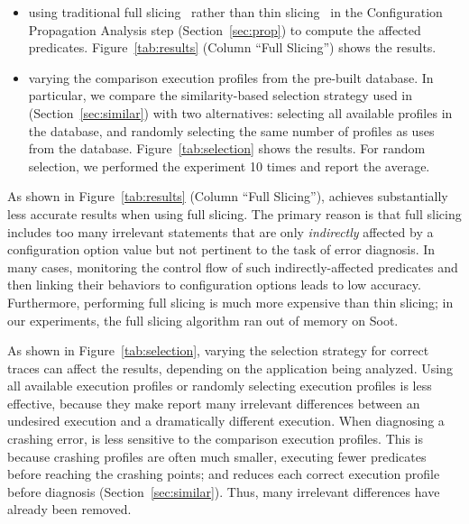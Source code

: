 \begin{itemize}
\item using traditional full slicing~\cite{Horwitz:1988} rather
than thin slicing~\cite{Sridharan:2007} in the Configuration
Propagation Analysis step (Section~\ref{sec:prop}) to compute the affected predicates.
Figure~\ref{tab:results}  (Column ``Full Slicing'') shows the results.
\item varying the comparison execution profiles from the pre-built database.
In particular, we compare the similarity-based selection strategy used in \ourtool
 (Section~\ref{sec:similar}) with two alternatives: selecting
all available profiles in the database, and
randomly selecting the same number of profiles as \ourtool uses from the database.
Figure~\ref{tab:selection} shows the results. For random selection, we
performed the experiment 10 times and report the average.
\end{itemize}


As shown in Figure~\ref{tab:results}  (Column ``Full Slicing''),
\ourtool achieves substantially less accurate results when using
full slicing. The primary reason is that full slicing includes
too many irrelevant statements that are only \textit{indirectly} affected by
a configuration option value but not pertinent to the task of
error diagnosis. In many cases, monitoring the control flow
of such indirectly-affected predicates and then linking their
behaviors to configuration options leads to low accuracy. Furthermore,
performing full slicing is much more expensive than thin slicing; in
our experiments, the full slicing algorithm ran out of
memory on Soot.



As shown in Figure~\ref{tab:selection}, varying the selection
strategy for correct traces can affect the results,
depending on the application being analyzed.
Using all available execution profiles or randomly
selecting execution profiles is less effective, because
they make \ourtool report many irrelevant
differences between an undesired
execution and a dramatically different execution.
When diagnosing a crashing error, \ourtool is less sensitive 
to the comparison execution profiles.
This is because crashing profiles are often much smaller, executing
fewer predicates before reaching the crashing points; and \ourtool
reduces each correct execution profile before diagnosis (Section~\ref{sec:similar}).
Thus, many irrelevant differences have already been removed.

